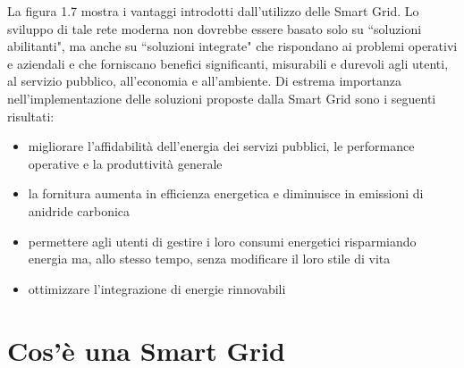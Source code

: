 \begin{figure}[h]
\end{figure}

La figura 1.7 mostra i vantaggi introdotti dall'utilizzo delle Smart Grid. Lo sviluppo di tale rete moderna non dovrebbe essere basato solo su ``soluzioni abilitanti", ma anche su ``soluzioni integrate" che rispondano ai problemi operativi e aziendali e che forniscano benefici significanti, misurabili e durevoli agli utenti, al servizio pubblico, all'economia e all'ambiente.
\newline 
Di estrema importanza nell'implementazione delle soluzioni proposte dalla Smart Grid sono i seguenti risultati:
\begin{itemize}
\item migliorare l'affidabilità dell'energia dei servizi pubblici, le performance operative e la produttività generale
\item la fornitura aumenta in efficienza energetica e diminuisce in emissioni di anidride carbonica
\item permettere agli utenti di gestire i loro consumi energetici risparmiando energia ma, allo stesso tempo, senza modificare il loro stile di vita
\item ottimizzare l'integrazione di energie rinnovabili 
\end{itemize}

\section{Cos'è una Smart Grid}


